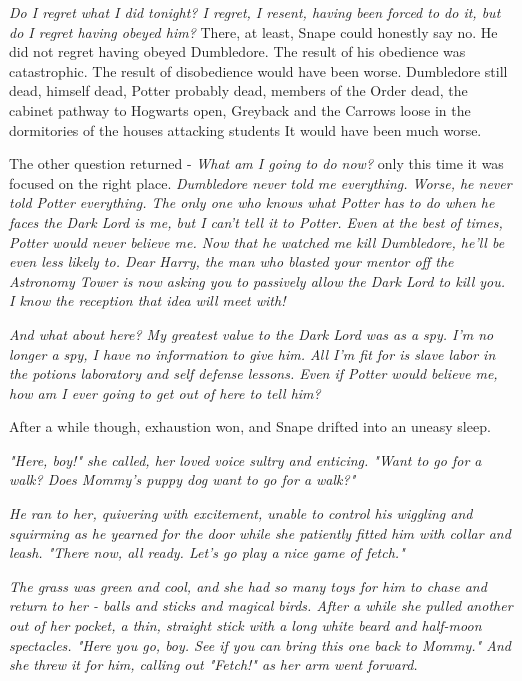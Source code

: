 \emph{Do I regret what I did tonight? I regret, I resent, having been forced to do it, but do I regret having obeyed him?} There, at least, Snape could honestly say no. He did not regret having obeyed Dumbledore. The result of his obedience was catastrophic. The result of disobedience would have been worse. Dumbledore still dead, himself dead, Potter probably dead, members of the Order dead, the cabinet pathway to Hogwarts open, Greyback and the Carrows loose in the dormitories of the houses attacking students{\el} It would have been much worse.

The other question returned - \emph{What am I going to do now?} only this time it was focused on the right place. \emph{Dumbledore never told me everything. Worse, he never told Potter everything. The only one who knows what Potter has to do when he faces the Dark Lord is me, but I can't tell it to Potter. Even at the best of times, Potter would never believe me. Now that he watched me kill Dumbledore, he'll be even less likely to. Dear Harry, the man who blasted your mentor off the Astronomy Tower is now asking you to passively allow the Dark Lord to kill you. I know the reception that idea will meet with!}

\emph{And what about here? My greatest value to the Dark Lord was as a spy. I'm no longer a spy, I have no information to give him. All I'm fit for is slave labor in the potions laboratory and self defense lessons. Even if Potter would believe me, how am I ever going to get out of here to tell him?}

After a while though, exhaustion won, and Snape drifted into an uneasy sleep.

\sbreak

\emph{"Here, boy!" she called, her loved voice sultry and enticing. "Want to go for a walk? Does Mommy's puppy dog want to go for a walk?"}

\emph{He ran to her, quivering with excitement, unable to control his wiggling and squirming as he yearned for the door while she patiently fitted him with collar and leash. "There now, all ready. Let's go play a nice game of fetch."}

\emph{The grass was green and cool, and she had so many toys for him to chase and return to her - balls and sticks and magical birds. After a while she pulled another out of her pocket, a thin, straight stick with a long white beard and half-moon spectacles. "Here you go, boy. See if you can bring this one back to Mommy." And she threw it for him, calling out "Fetch!" as her arm went forward.}

